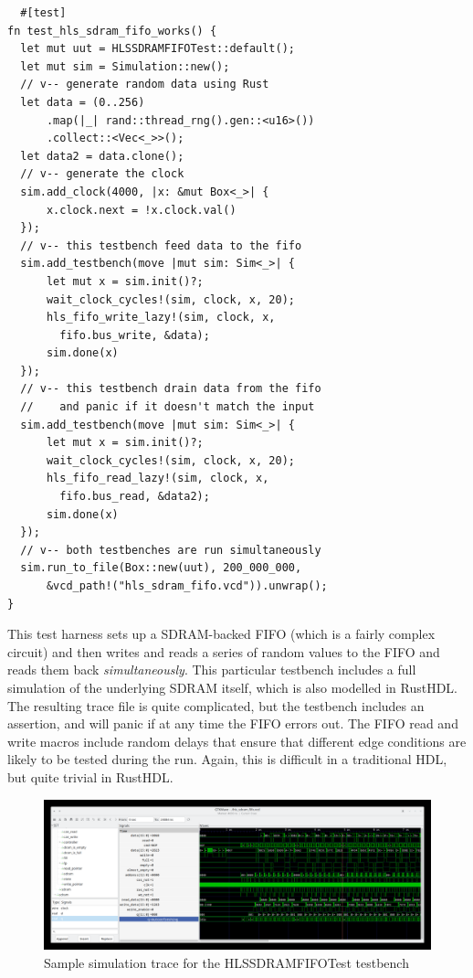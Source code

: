 \documentclass[conference]{IEEEtran}
\begin{document}
\begin{verbatim}
  #[test]
fn test_hls_sdram_fifo_works() {
  let mut uut = HLSSDRAMFIFOTest::default();
  let mut sim = Simulation::new();
  // v-- generate random data using Rust
  let data = (0..256)
      .map(|_| rand::thread_rng().gen::<u16>())
      .collect::<Vec<_>>();
  let data2 = data.clone();
  // v-- generate the clock
  sim.add_clock(4000, |x: &mut Box<_>| {
      x.clock.next = !x.clock.val()
  });
  // v-- this testbench feed data to the fifo
  sim.add_testbench(move |mut sim: Sim<_>| {
      let mut x = sim.init()?;
      wait_clock_cycles!(sim, clock, x, 20);
      hls_fifo_write_lazy!(sim, clock, x, 
        fifo.bus_write, &data);
      sim.done(x)
  });
  // v-- this testbench drain data from the fifo
  //    and panic if it doesn't match the input
  sim.add_testbench(move |mut sim: Sim<_>| {
      let mut x = sim.init()?;
      wait_clock_cycles!(sim, clock, x, 20);
      hls_fifo_read_lazy!(sim, clock, x, 
        fifo.bus_read, &data2);
      sim.done(x)
  });
  // v-- both testbenches are run simultaneously
  sim.run_to_file(Box::new(uut), 200_000_000, 
      &vcd_path!("hls_sdram_fifo.vcd")).unwrap();
}
\end{verbatim}

This test harness sets up a SDRAM-backed FIFO (which is a fairly complex circuit) and then writes and reads a 
series of random values to the FIFO and reads them back \emph{simultaneously}.  This particular testbench includes
a full simulation of the underlying SDRAM itself, which is also modelled in RustHDL.  The resulting trace file is
quite complicated, but the testbench includes an assertion, and will panic if at any time the FIFO errors out.  The 
FIFO read and write macros include random delays that ensure that different edge conditions are likely to be tested 
during the run.  Again, this is difficult in a traditional HDL, but quite trivial in RustHDL.

\begin{figure}[htbp]
  \centerline{\includegraphics[width=18cm]{hls_sdram_fifo.png}}
  \caption{Sample simulation trace for the \textrm{HLSSDRAMFIFOTest} testbench}
  \label{fig}
\end{figure}
  
\end{document}
